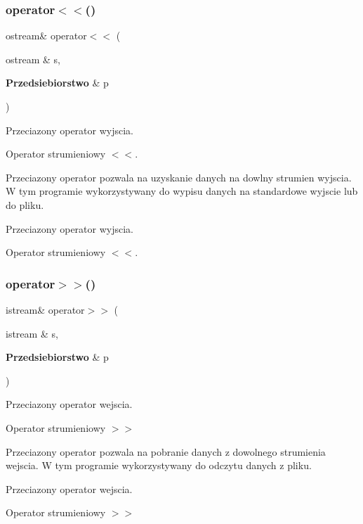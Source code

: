 \subsubsection{operator$<$$<$()}
{\footnotesize\ttfamily ostream\& operator$<$$<$ (\begin{DoxyParamCaption}\item[{ostream \&}]{s,  }\item[{\textbf{ Przedsiebiorstwo} \&}]{p }\end{DoxyParamCaption})}



Przeciazony operator wyjscia. 

Operator strumieniowy $<$$<$.

Przeciazony operator pozwala na uzyskanie danych na dowlny strumien wyjscia. W tym programie wykorzystywany do wypisu danych na standardowe wyjscie lub do pliku.

Przeciazony operator wyjscia.

Operator strumieniowy $<$$<$. \mbox{\label{_przedsiebiorstwo_8h_af9de6edea9cbaa7152816ed3251f934e}} 
\subsubsection{operator$>$$>$()}
{\footnotesize\ttfamily istream\& operator$>$$>$ (\begin{DoxyParamCaption}\item[{istream \&}]{s,  }\item[{\textbf{ Przedsiebiorstwo} \&}]{p }\end{DoxyParamCaption})}



Przeciazony operator wejscia. 

Operator strumieniowy $>$$>$

Przeciazony operator pozwala na pobranie danych z dowolnego strumienia wejscia. W tym programie wykorzystywany do odczytu danych z pliku.

Przeciazony operator wejscia.

Operator strumieniowy $>$$>$ 